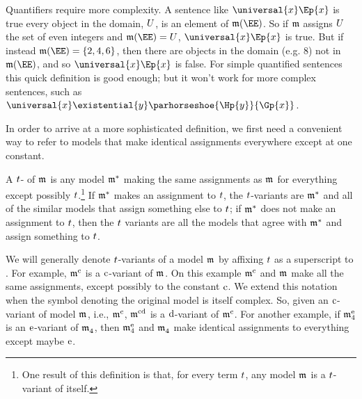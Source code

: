 Quantifiers require more complexity. A sentence like $\universal{\variable{x}}\Ep{\variable{x}}$ is true \Iff every object in the domain, $U$, is an element of $\IntA(\EE)$. So if $\mathfrak{m}$ assigns $U$ the set of even integers and $\IntA(\EE)=\integer{U}$, $\universal{\variable{x}}\Ep{\variable{x}}$ is true. But if instead $\IntA(\EE)=\{2, 4, 6\}$, then there are objects in the domain (e.g. $8$) not in $\IntA(\EE)$, and so $\universal{\variable{x}}\Ep{\variable{x}}$ is false. For simple quantified sentences this quick definition is good enough; but it won't work for more complex sentences, such as $\universal{\variable{x}}\existential{\variable{y}}\parhorseshoe{\Hp{\variable{y}}}{\Gp{\variable{x}}}$.

In order to arrive at a more sophisticated definition, we first need a convenient way to refer to models that make identical assignments everywhere except at one constant.

\begin{majorILnc}{}
A $t$- of $\As{}{}$ is any model $\mathfrak{m^{\mathrm{*}}_{\mathrm{}}}$ making the same assignments as $\As{}{}$ for everything except possibly $t$.\footnote{One result of this definition is that, for every term $t$, any model $\As{}{}$ is a $t$-variant of itself.}  If $\mathfrak{m^{\mathrm{*}}_{\mathrm{}}}$ makes an assignment to $t$, the $t$-variants are $\mathfrak{m^{\mathrm{*}}_{\mathrm{}}}$ and all of the similar models that assign something else to $t$;  if $\mathfrak{m^{\mathrm{*}}_{\mathrm{}}}$ does not make an assignment to $t$, then the $t$ variants are all the models that agree with $\mathfrak{m^{\mathrm{*}}_{\mathrm{}}}$ and assign something to $t$.
\end{majorILnc}
\noindent{}We will generally denote $t$-variants of a model $\As{}{}$ by affixing $t$ as a superscript to \mention{$\As{}{}$}. For example, $\mathfrak{m^{\mathrm{\mathrm{c}}}_{\mathrm{}}}$ is a $\mathrm{c}$-variant of $\As{}{}$.  On this example $\mathfrak{m^{\mathrm{\mathrm{c}}}_{\mathrm{}}}$ and $\As{}{}$ make all the same assignments, except possibly to the constant $\mathrm{c}$.
We extend this notation when the symbol denoting the original model is itself complex.
So, given an $\mathrm{c}$-variant of model $\As{}{}$, i.e., $\mathfrak{m^{\mathrm{\mathrm{c}}}_{\mathrm{}}}$, $\mathfrak{m^{\mathrm{\mathrm{cd}}}_{\mathrm{}}}$ is a $\mathrm{d}$-variant of $\mathfrak{m^{\mathrm{\mathrm{c}}}_{\mathrm{}}}$.  For another example, if $\mathfrak{m^{\mathrm{\mathrm{e}}}_{\mathrm{4}}}$ is an $\mathrm{e}$-variant of $\mathfrak{m^{\mathrm{}}_{\mathrm{4}}}$, then $\mathfrak{m^{\mathrm{\mathrm{e}}}_{\mathrm{4}}}$ and $\mathfrak{m^{\mathrm{}}_{\mathrm{4}}}$ make identical assignments to everything except maybe $\mathrm{e}$. 

